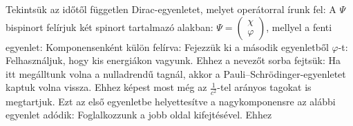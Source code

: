    Tekintsük az időtől független Dirac-egyenletet, melyet  operátorral írunk fel:
   A $\Psi$ bispinort felírjuk két spinort tartalmazó alakban: $\Psi=\begin{pmatrix}\chi\\ \varphi\end{pmatrix}$, mellyel a fenti egyenlet:
   Komponensenként külön felírva:
   Fejezzük ki a második egyenletből $\varphi$-t:
   Felhasználjuk, hogy kis energiákon vagyunk.
   Ehhez a nevezőt sorba fejtsük: 
   Ha itt megálltunk volna a nulladrendű tagnál, akkor a Pauli--Schrödinger-egyenletet kaptuk volna vissza.
   Ehhez képest most még az $\frac{1}{c^2}$-tel arányos tagokat is megtartjuk.
   Ezt az első egyenletbe helyettesítve a nagykomponensre az alábbi egyenlet adódik:
   Foglalkozzunk a jobb oldal kifejtésével.
   Ehhez
